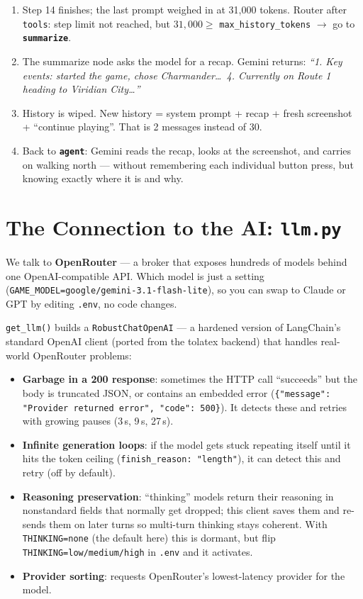 \documentclass[11pt]{article}
\newcommand{\code}[1]{\texttt{#1}}
\begin{document}
\begin{enumerate}[nosep]
  \item Step 14 finishes; the last prompt weighed in at 31{,}000 tokens. Router after \code{tools}: step limit not reached, but $31{,}000 \geq$ \code{max\_history\_tokens} $\rightarrow$ go to \textbf{\code{summarize}}.
  \item The summarize node asks the model for a recap. Gemini returns: \emph{``1. Key events: started the game, chose Charmander\ldots\ 4. Currently on Route 1 heading to Viridian City\ldots''}
  \item History is wiped. New history = system prompt + recap + fresh screenshot + ``continue playing''. That is 2 messages instead of 30.
  \item Back to \textbf{\code{agent}}: Gemini reads the recap, looks at the screenshot, and carries on walking north --- without remembering each individual button press, but knowing exactly where it is and why.
\end{enumerate}

\section{The Connection to the AI: \code{llm.py}}

We talk to \textbf{OpenRouter} --- a broker that exposes hundreds of models behind one OpenAI-compatible API. Which model is just a setting (\code{GAME\_MODEL=google/gemini-3.1-flash-lite}), so you can swap to Claude or GPT by editing \code{.env}, no code changes.

\code{get\_llm()} builds a \code{RobustChatOpenAI} --- a hardened version of LangChain's standard OpenAI client (ported from the tolatex backend) that handles real-world OpenRouter problems:

\begin{itemize}
  \item \textbf{Garbage in a 200 response}: sometimes the HTTP call ``succeeds'' but the body is truncated JSON, or contains an embedded error (\code{\{"message": "Provider returned error", "code": 500\}}). It detects these and retries with growing pauses (3\,s, 9\,s, 27\,s).
  \item \textbf{Infinite generation loops}: if the model gets stuck repeating itself until it hits the token ceiling (\code{finish\_reason: "length"}), it can detect this and retry (off by default).
  \item \textbf{Reasoning preservation}: ``thinking'' models return their reasoning in nonstandard fields that normally get dropped; this client saves them and re-sends them on later turns so multi-turn thinking stays coherent. With \code{THINKING=none} (the default here) this is dormant, but flip \code{THINKING=low/medium/high} in \code{.env} and it activates.
  \item \textbf{Provider sorting}: requests OpenRouter's lowest-latency provider for the model.
\end{itemize}
\end{document}
